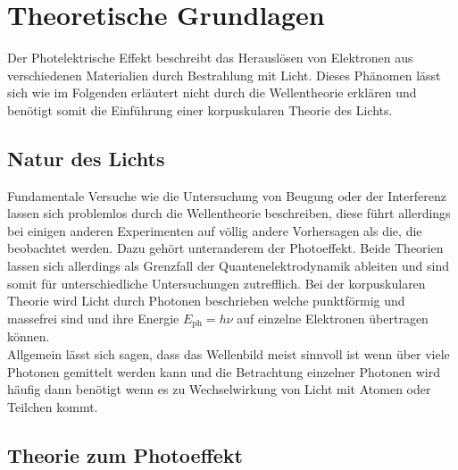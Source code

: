\section{Theoretische Grundlagen}

Der Photelektrische Effekt beschreibt das Herauslösen von Elektronen aus verschiedenen Materialien durch Bestrahlung mit Licht. Dieses Phänomen lässt sich 
wie im Folgenden erläutert nicht durch die Wellentheorie erklären und benötigt somit die Einführung einer korpuskularen Theorie des Lichts.

\subsection{Natur des Lichts}

Fundamentale Versuche wie die Untersuchung von Beugung oder der Interferenz lassen sich problemlos durch die Wellentheorie beschreiben, diese führt allerdings bei einigen anderen Experimenten auf
völlig andere Vorhersagen als die, die beobachtet werden. Dazu gehört unteranderem der Photoeffekt. Beide Theorien lassen sich allerdings als Grenzfall der Quantenelektrodynamik ableiten und sind somit für unterschiedliche 
Untersuchungen zutrefflich. Bei der korpuskularen Theorie wird Licht durch Photonen beschrieben welche punktförmig und massefrei sind und ihre Energie $E_{\text{ph}} = h\nu$ auf einzelne Elektronen übertragen können.
\\
Allgemein lässt sich sagen, dass das Wellenbild meist sinnvoll ist wenn über viele Photonen gemittelt werden kann und die Betrachtung einzelner Photonen wird häufig dann benötigt wenn es zu Wechselwirkung von Licht mit Atomen oder Teilchen kommt.

\subsection{Theorie zum Photoeffekt}

